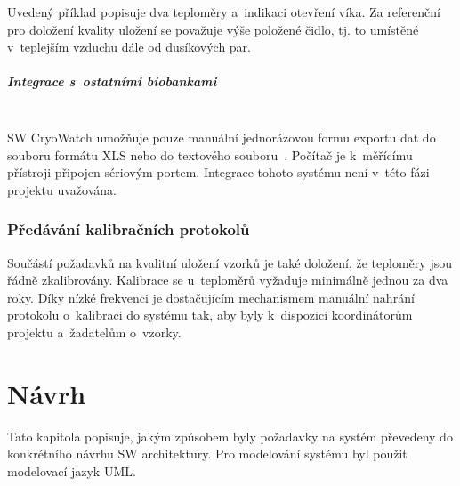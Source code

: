 \documentclass[11pt, draft, oneside]{fithesis2}
\newcommand{\paragraphNewLine}[1]{\paragraph*{#1}\mbox{}\\}
\begin{document}
Uvedený příklad popisuje dva teploměry a~indikaci otevření víka. Za referenční pro doložení kvality uložení se považuje výše položené čidlo, tj. to umístěné v~teplejším vzduchu dále od dusíkových par. 

\paragraphNewLine{Integrace s~ostatními biobankami}
SW CryoWatch umožňuje pouze manuální jednorázovou formu exportu dat do souboru formátu XLS nebo do textového souboru~\cite{M355CE}. Počítač je k~měřícímu přístroji připojen sériovým portem. Integrace tohoto systému není v~této fázi projektu uvažována. 

\subsection{Předávání kalibračních protokolů}
Součástí požadavků na kvalitní uložení vzorků je také doložení, že teploměry jsou řádně zkalibrovány. Kalibrace se u~teploměrů vyžaduje minimálně jednou za dva roky. Díky nízké frekvenci je dostačujícím mechanismem manuální nahrání protokolu o~kalibraci do systému tak, aby byly k~dispozici koordinátorům projektu a~žadatelům o~vzorky.




\chapter{Návrh}\label{chapter:proposal}
Tato kapitola popisuje, jakým způsobem byly požadavky na systém převedeny do konkrétního návrhu SW architektury. Pro modelování systému byl použit modelovací jazyk UML.

\end{document}
